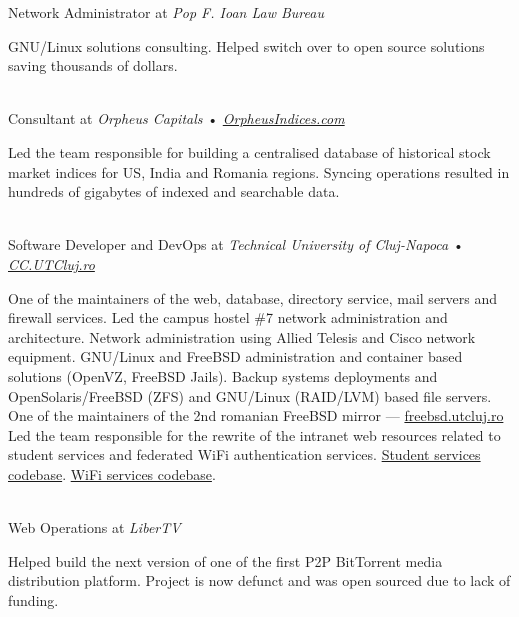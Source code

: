 \documentclass[10pt, a4paper]{article}
\newcommand{\years}[1]{\marginnote{\scriptsize #1}}
\begin{document}
\years{2009-2012}Network Administrator at \emph{Pop F. Ioan Law Bureau}
\\
\begin{footnotesize}
GNU/Linux solutions consulting. Helped switch over to open source solutions
saving thousands of dollars.
\end{footnotesize}
\\[.2cm]

\years{2009}Consultant at \emph{Orpheus Capitals} • \emph{\href{http://www.orpheusindices.com/}{OrpheusIndices.com}}
\\
\begin{footnotesize}
Led the team responsible for building a centralised database of historical
stock market indices for US, India and Romania regions.
Syncing operations resulted in hundreds of gigabytes of indexed and searchable
data.
\end{footnotesize}
\\[.2cm]

\years{2008-2010}Software Developer and DevOps at \emph{Technical University of Cluj-Napoca} • \emph{\href{http://cc.utcluj.ro/}{CC.UTCluj.ro}}
\\
\begin{footnotesize}
One of the maintainers of the web, database, directory service, mail servers
and firewall services.
Led the campus hostel \#7 network administration and architecture.
Network administration using Allied Telesis and Cisco network equipment.
GNU/Linux and FreeBSD administration and container based solutions (OpenVZ,
FreeBSD Jails).
Backup systems deployments and OpenSolaris/FreeBSD (ZFS) and
GNU/Linux (RAID/LVM) based file servers.
One of the maintainers of the 2nd romanian FreeBSD mirror ---
\href{http://freebsd.utcluj.ro}{freebsd.utcluj.ro}\\
Led the team responsible for the rewrite of the intranet web resources related
to student services and federated WiFi authentication services.
\href{http://github.com/stas/student.utcluj.ro}{Student services codebase}.
\href{http://github.com/stas/eduroam-db}{WiFi services codebase}.
\end{footnotesize}
\\[.2cm]

\years{2008-2009}Web Operations at \emph{LiberTV}
\\
\begin{footnotesize}
Helped build the next version of one of the first P2P BitTorrent media
distribution platform. Project is now defunct and was open sourced due to
lack of funding.
\end{footnotesize}
\\[.2cm]
\end{document}
